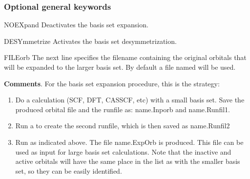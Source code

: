 \subsubsection{Optional general keywords}
\begin{keywordlist}
\item[NOEXpand]
Deactivates the basis set expansion.
\item[DESYmmetrize]
Activates the basis set desymmetrization.
\item[FILEorb]
The next line specifies the filename containing the original orbitals that will
be expanded to the larger basis set. By default a file named  will be used.

\end{keywordlist}


{\bf Comments}. For the basis set expansion
 procedure, this is the strategy:
\begin{enumerate}
\item
Do a calculation (SCF, DFT, CASSCF, etc) with a small basis set. Save the
produced orbital file and the runfile as: name.Inporb and name.Runfil1.
\item
Run a  to create the second runfile, which is then saved as
name.Runfil2
\item
Run  as indicated above. The file name.ExpOrb is produced.
This file can be used as input for large basis set calculations. Note that the
inactive and active orbitals will have the same place in the list as with the
smaller basis set, so they can be easily identified.
\end{enumerate}
